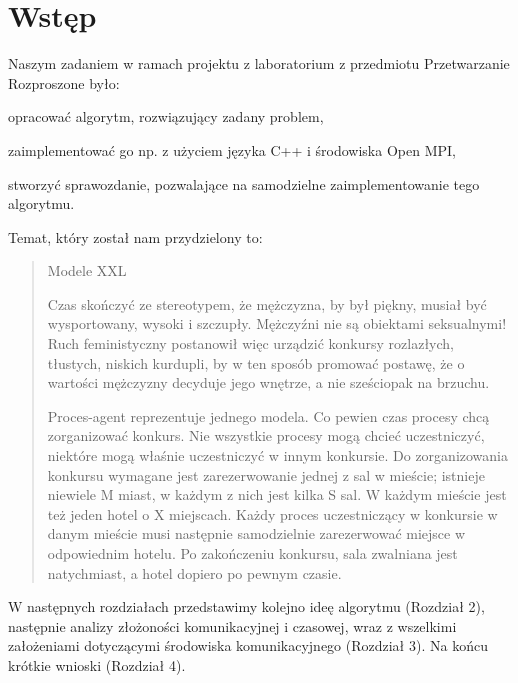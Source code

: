 \documentclass{article}
\begin{document}



\section{Wstęp}


Naszym zadaniem w ramach projektu z laboratorium z przedmiotu Przetwarzanie Rozproszone było:

\begin{tightlist}
\item opracować algorytm, rozwiązujący zadany problem,
\item zaimplementować go np. z użyciem języka C++ i środowiska Open MPI,
\item stworzyć sprawozdanie, pozwalające na samodzielne zaimplementowanie tego algorytmu.
\end{tightlist}

Temat, który został nam przydzielony to:
\begin{quote}
\begin{large}
\begin{center}
Modele XXL
\end{center}
\end{large}

 Czas skończyć ze stereotypem, że mężczyzna, by był piękny, musiał być wysportowany, wysoki i szczupły. Mężczyźni nie są obiektami seksualnymi! Ruch feministyczny postanowił więc urządzić konkursy rozlazłych, tłustych, niskich kurdupli, by w ten sposób promować postawę, że o wartości mężczyzny decyduje jego wnętrze, a nie sześciopak na brzuchu.

Proces-agent reprezentuje jednego modela. Co pewien czas procesy chcą zorganizować konkurs. Nie wszystkie procesy mogą chcieć uczestniczyć, niektóre mogą właśnie uczestniczyć w innym konkursie. Do zorganizowania konkursu wymagane jest zarezerwowanie jednej z sal w mieście; istnieje niewiele M miast, w każdym z nich jest kilka S sal. W każdym mieście jest też jeden hotel o X miejscach. Każdy proces uczestniczący w konkursie w danym mieście musi następnie samodzielnie zarezerwować miejsce w odpowiednim hotelu. Po zakończeniu konkursu, sala zwalniana jest natychmiast, a hotel dopiero po pewnym czasie. 
\end{quote}

W następnych rozdziałach przedstawimy kolejno ideę algorytmu (Rozdział 2), następnie analizy złożoności komunikacyjnej i czasowej, wraz z wszelkimi założeniami dotyczącymi środowiska komunikacyjnego (Rozdział 3). Na końcu krótkie wnioski (Rozdział 4).
\end{document}
